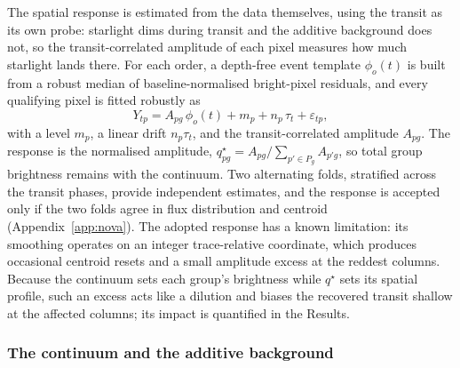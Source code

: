 The spatial response is estimated from the data themselves, using the
transit as its own probe: starlight dims during transit and the additive
background does not, so the transit-correlated amplitude of each pixel
measures how much starlight lands there. For each order, a depth-free
event template $\phi_o(t)$ is built from a robust median of
baseline-normalised bright-pixel residuals, and every qualifying pixel is
fitted robustly as
\begin{equation}
 Y_{tp} = A_{pg}\,\phi_{o}(t) + m_p + n_p\,\tau_t + \varepsilon_{tp},
 \label{eq:qstar-fit}
\end{equation}
with a level $m_p$, a linear drift $n_p\tau_t$, and the transit-correlated
amplitude $A_{pg}$. The response is the normalised amplitude,
$q^\star_{pg}=A_{pg}/\sum_{p'\in P_g}A_{p'g}$, so total group brightness
remains with the continuum. Two alternating folds, stratified across the
transit phases, provide independent estimates, and the response is
accepted only if the two folds agree in flux distribution and centroid
(Appendix~\ref{app:nova}). The adopted response has a known limitation:
its smoothing operates on an integer trace-relative coordinate, which
produces occasional centroid resets and a small amplitude excess at the
reddest columns. Because the continuum sets each group's brightness while
$q^\star$ sets its spatial profile, such an excess acts like a dilution
and biases the recovered transit shallow at the affected columns; its
impact is quantified in the Results.

\subsubsection{The continuum and the additive background}


